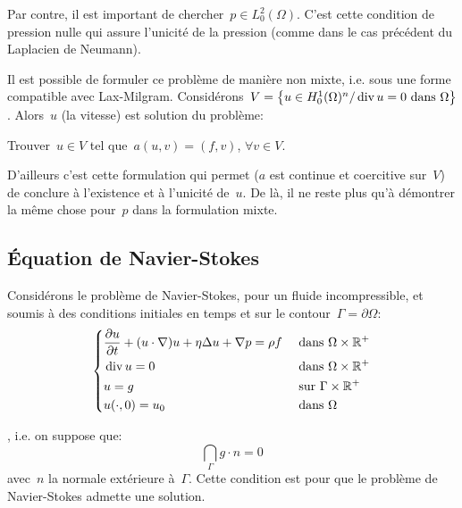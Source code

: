 Par contre, il est important de chercher~$p \in L^2_0(\Omega)$. C'est cette condition
de pression nulle qui assure l'unicité de la pression (comme dans le cas précédent du
Laplacien de Neumann).

\medskip
Il est possible de formuler ce problème de manière non mixte, i.e. sous une forme
compatible avec Lax-Milgram.
Considérons~$V=\left\{ u\in H^1_0(\Omega)^n / \operatorname{div} u=0 \text{ dans } \Omega\right\}$.
Alors~$u$ (la vitesse) est solution du problème:
\begin{center}
Trouver~$u\in V$ tel que~$a(u,v)=(f,v)$, $\forall v\in V$.
\end{center}
D'ailleurs c'est cette formulation qui permet ($a$ est continue et coercitive sur~$V$) de
conclure à l'existence et à l'unicité de~$u$.
De là, il ne reste plus qu'à démontrer la même chose pour~$p$ dans la formulation mixte.

\medskip
\subsection{Équation de Navier-Stokes}

Considérons le problème de Navier-Stokes, pour un fluide incompressible, et soumis
à des conditions initiales en temps et sur le contour~$\Gamma=\partial\Omega$:
\begin{equation}\left\{
\begin{aligned}
&\dfrac{\partial u}{\partial t} + (u\cdot\nabla) u + \eta\Delta u + \nabla p = \rho f && \text{ dans } \Omega\times\mathbb R^+\\
&\operatorname{div} u = 0&& \text{ dans } \Omega\times\mathbb R^+\\
&u=g &&\text{ sur } \Gamma\times\mathbb R^+\\
&u(\cdot,0) =u_0 &&\text{ dans }\Omega
\end{aligned}\right.
\end{equation}

, i.e. on suppose que:
\begin{equation}
\dint_\Gamma g\cdot n %
= 0
\end{equation}
avec~$n$ la normale extérieure à~$\Gamma$.
Cette condition est  pour que le problème de Navier-Stokes admette une
solution.

